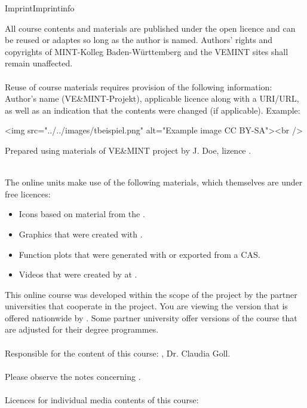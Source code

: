 \begin{MXContent}{Imprint}{Imprint}{info}

All course contents and materials are published under the open licence 
and can be reused or adaptes so long as the author is named.
Authors' rights and copyrights of MINT-Kolleg Baden-Württemberg and
the VEMINT sites shall remain unaffected.
\ \\ \ \\
Reuse of course materials requires provision of the following information: Author's name (VE\&MINT-Projekt), applicable licence along with a URI/URL,
as well as an indication that the contents were changed (if applicable). Example:

\begin{center}
\begin{html}
<img src="../../images/tbeispiel.png" alt="Example image CC BY-SA"><br />
\end{html}
Prepared using materials of VE\&MINT project by J. Doe, lizence .
\end{center}
\ \\

The online units make use of the following materials, which themselves are under free licences:
\begin{itemize}
\item{Icons based on material from the .}
\item{Graphics that were created with .}
\item{Function plots that were generated with  or exported from a CAS.}
\item{Videos that were created by  at .}
\end{itemize}

This online course was developed within the scope of the  project by the partner universities that cooperate in the project.
You are viewing the version that is offered nationwide by .
Some partner university offer versions of the course that are adjusted for their degree programmes.
\ \\ \ \\
Responsible for the content of this course: , Dr. Claudia Goll. 
\ \\ \ \\
Please observe the notes concerning .
\ \\ \ \\
Licences for individual media contents of this course:\ \\
\MCopyrightCollection




\end{MXContent}
